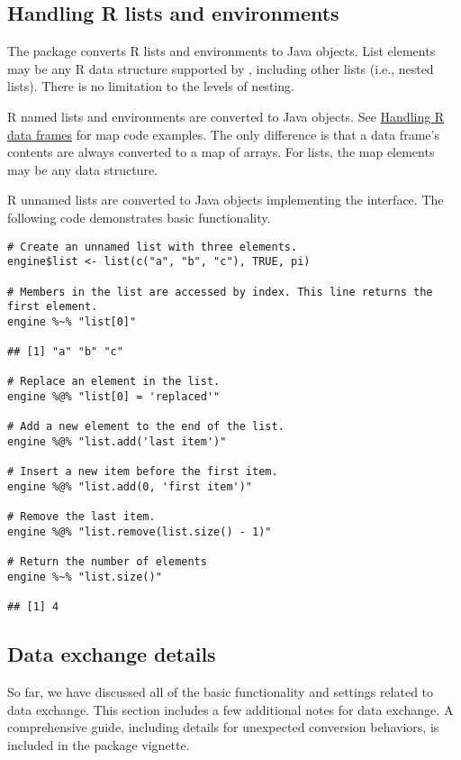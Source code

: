 \subsection{Handling R lists and environments}
The  package converts R lists and environments to Java objects. List elements may be any R data structure supported by , including other lists (i.e., nested lists). There is no limitation to the levels of nesting.

R named lists and environments are converted to Java \href{https://docs.oracle.com/javase/8/docs/api/java/util/HashMap.html}{} objects. See \hyperlink{handlingrdataframes}{Handling R data frames} for map code examples. The only difference is that a data frame's contents are always converted to a map of arrays. For lists, the map elements may be any data structure.

R unnamed lists are converted to Java objects implementing the \href{https://docs.oracle.com/javase/8/docs/api/java/util/ArrayList.html}{} interface. The following code demonstrates basic  functionality.

\begin{verbatim}
# Create an unnamed list with three elements.
engine$list <- list(c("a", "b", "c"), TRUE, pi)

# Members in the list are accessed by index. This line returns the first element.
engine %~% "list[0]"

## [1] "a" "b" "c"

# Replace an element in the list.
engine %@% "list[0] = 'replaced'"

# Add a new element to the end of the list.
engine %@% "list.add('last item')"

# Insert a new item before the first item.
engine %@% "list.add(0, 'first item')"

# Remove the last item.
engine %@% "list.remove(list.size() - 1)"

# Return the number of elements
engine %~% "list.size()"

## [1] 4
\end{verbatim}

\subsection{Data exchange details}

So far, we have discussed all of the basic functionality and settings related to data exchange. This section includes a few additional notes for data exchange. A comprehensive guide, including details for unexpected conversion behaviors, is included in the  package vignette.

